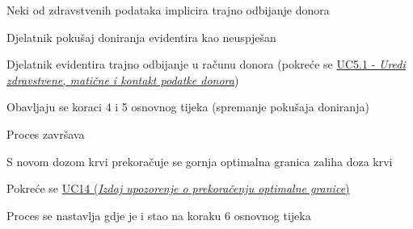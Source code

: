 \begin{packed_item}
\begin{packed_item}
							\item[2.b] Neki od zdravstvenih podataka implicira trajno odbijanje donora
							\begin{packed_enum}
								\item Djelatnik pokušaj doniranja evidentira kao neuspješan
								\item Djelatnik evidentira trajno odbijanje u računu donora (pokreće se \hyperref[UC5.1]{UC5.1 - \textit{Uredi zdravstvene, matične i kontakt podatke donora}})
								\item Obavljaju se koraci 4 i 5 osnovnog tijeka (spremanje pokušaja doniranja)
								\item Proces završava
							\end{packed_enum}
							
							\item[6] S novom dozom krvi prekoračuje se gornja optimalna granica zaliha doza krvi
							\begin{packed_enum}
							    \item Pokreće se \hyperref[UC14]{UC14 (\textit{Izdaj upozorenje o prekoračenju optimalne granice})}
								\item Proces se nastavlja gdje je i stao na koraku 6 osnovnog tijeka
							\end{packed_enum}
							
						\end{packed_item}
						
					\end{packed_item}
					
